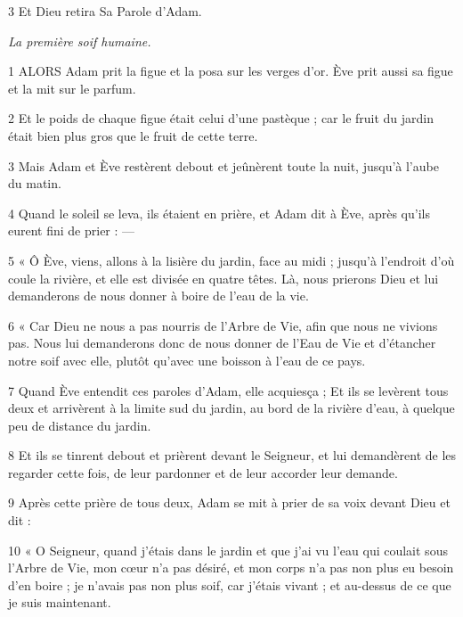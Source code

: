 \par 3 Et Dieu retira Sa Parole d'Adam.


\par \textit{La première soif humaine.}

\par 1 ALORS Adam prit la figue et la posa sur les verges d'or. Ève prit aussi sa figue et la mit sur le parfum.

\par 2 Et le poids de chaque figue était celui d'une pastèque ; car le fruit du jardin était bien plus gros que le fruit de cette terre.

\par 3 Mais Adam et Ève restèrent debout et jeûnèrent toute la nuit, jusqu'à l'aube du matin.

\par 4 Quand le soleil se leva, ils étaient en prière, et Adam dit à Ève, après qu'ils eurent fini de prier : —

\par 5 « Ô Ève, viens, allons à la lisière du jardin, face au midi ; jusqu'à l'endroit d'où coule la rivière, et elle est divisée en quatre têtes. Là, nous prierons Dieu et lui demanderons de nous donner à boire de l'eau de la vie.

\par 6 « Car Dieu ne nous a pas nourris de l'Arbre de Vie, afin que nous ne vivions pas. Nous lui demanderons donc de nous donner de l’Eau de Vie et d’étancher notre soif avec elle, plutôt qu’avec une boisson à l’eau de ce pays.

\par 7 Quand Ève entendit ces paroles d'Adam, elle acquiesça ; Et ils se levèrent tous deux et arrivèrent à la limite sud du jardin, au bord de la rivière d'eau, à quelque peu de distance du jardin.

\par 8 Et ils se tinrent debout et prièrent devant le Seigneur, et lui demandèrent de les regarder cette fois, de leur pardonner et de leur accorder leur demande.

\par 9 Après cette prière de tous deux, Adam se mit à prier de sa voix devant Dieu et dit :

\par 10 « O Seigneur, quand j'étais dans le jardin et que j'ai vu l'eau qui coulait sous l'Arbre de Vie, mon cœur n'a pas désiré, et mon corps n'a pas non plus eu besoin d'en boire ; je n’avais pas non plus soif, car j’étais vivant ; et au-dessus de ce que je suis maintenant.


